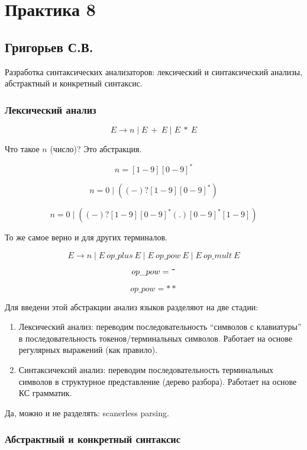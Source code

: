\section{Практика 8}

\subsection{Григорьев С.В.}

Разработка синтаксических анализаторов: лексический и синтаксический анализы, абстрактный и конкретный синтаксис.

\subsubsection{Лексический анализ}

$$
E \to n \mid E \ + \ E \mid E \ * \ E
$$

Что такое $n$ (число)? Это абстракция.

$$
n = [1-9][0-9]^*
$$

$$
n = 0 \mid ((-)?[1-9][0-9]^*)
$$

$$
n = 0 \mid ((-)?[1-9][0-9]^*(.)[0-9]^*[1-9])
$$

То же самое верно и для других терминалов.

$$
E \to n \mid E \ op\_plus \ E \mid E \ op\_pow \ E \mid E \ op\_mult \ E
$$

$$
op\_pow = \verb|^|
$$


$$
op\_pow = **
$$

Для введени этой абстракции анализ языков разделяют на две стадии:
\begin{enumerate}
	\item Лексический анализ: переводим последовательность ``символов с клавиатуры'' в последовательность токенов/терминальных символов. Работает на основе регулярных выражений (как правило).

	\item Синтаксичексий анализ: переводим последовательность терминальных символов в структурное представление (дерево разбора). Работает на основе КС грамматик.
\end{enumerate}


Да, можно и не разделять: scanerless parsing.


\subsubsection{Абстрактный и конкретный синтаксис}

